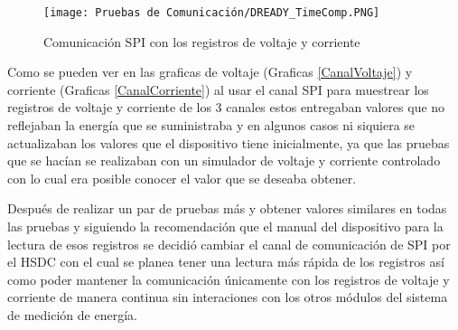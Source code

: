 \documentclass[letterpaper,12pt,oneside]{book}
\begin{document}
		\begin{figure}[!htpb]
			\centering
			\texttt{[image: Pruebas de Comunicación/DREADY\_TimeComp.PNG]}
			\caption[Comunicación SPI con los registros de voltaje y corriente]{Comunicación SPI con los registros de voltaje y corriente}
			\label{ComSPI} 
		\end{figure}

		Como se pueden ver en las graficas de voltaje (Graficas \ref{CanalVoltaje}) y corriente (Graficas \ref{CanalCorriente}) al usar el canal SPI para muestrear los registros de voltaje y corriente de los 3 canales estos entregaban valores que no reflejaban la energía que se suministraba y en algunos casos ni siquiera se actualizaban los valores que el dispositivo tiene inicialmente, ya que las pruebas que se hacían se realizaban con un simulador de voltaje y corriente controlado con lo cual era posible conocer el valor que se deseaba obtener.

		Después de realizar un par de pruebas más y obtener valores similares en todas las pruebas y siguiendo la recomendación que el manual del dispositivo para la lectura de esos registros se decidió cambiar el canal de comunicación de SPI por el HSDC con el cual se planea tener una lectura más rápida de los registros así como poder mantener la comunicación únicamente con los registros de voltaje y corriente de manera continua sin interaciones con los otros módulos del sistema de medición de energía.
\end{document}
